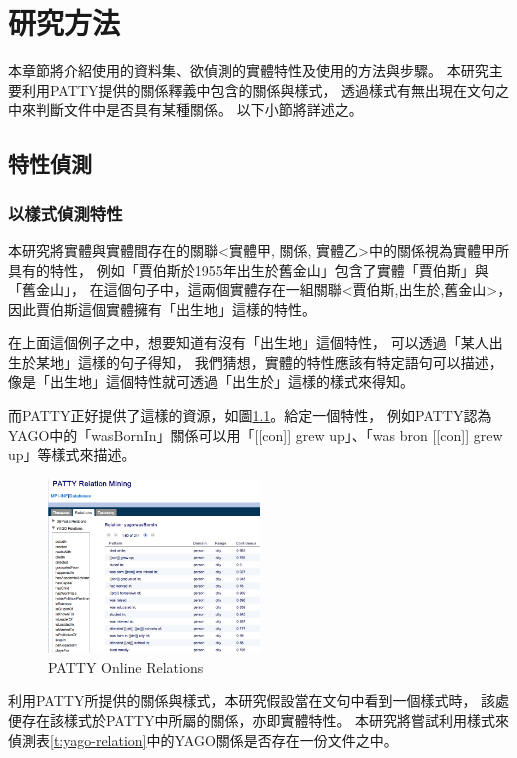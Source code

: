 %
%
%
\chapter{研究方法}
\label{c:method}

本章節將介紹使用的資料集、欲偵測的實體特性及使用的方法與步驟。
本研究主要利用PATTY提供的關係釋義中包含的關係與樣式，
透過樣式有無出現在文句之中來判斷文件中是否具有某種關係。
以下小節將詳述之。

\section{特性偵測}
\subsection{以樣式偵測特性}
本研究將實體與實體間存在的關聯<實體甲, 關係, 實體乙>中的關係視為實體甲所具有的特性，
例如「賈伯斯於1955年出生於舊金山」包含了實體「賈伯斯」與「舊金山」，
在這個句子中，這兩個實體存在一組關聯<賈伯斯,出生於,舊金山>，
因此賈伯斯這個實體擁有「出生地」這樣的特性。

在上面這個例子之中，想要知道有沒有「出生地」這個特性，
可以透過「某人出生於某地」這樣的句子得知，
我們猜想，實體的特性應該有特定語句可以描述，
像是「出生地」這個特性就可透過「出生於」這樣的樣式來得知。

而PATTY正好提供了這樣的資源，如圖\ref{i:patty-online}。給定一個特性，
例如PATTY認為YAGO中的「wasBornIn」關係可以用「[[con]] grew up」、「was bron [[con]] grew up」等樣式來描述。

\begin{figure}
    \centering
    \includegraphics[width=0.5\textwidth]{images/03-patty-online}
    \caption{PATTY Online Relations}
    \label{i:patty-online}
\end{figure}

利用PATTY所提供的關係與樣式，本研究假設當在文句中看到一個樣式時，
該處便存在該樣式於PATTY中所屬的關係，亦即實體特性。
本研究將嘗試利用樣式來偵測表\ref{t:yago-relation}中的YAGO關係是否存在一份文件之中。

